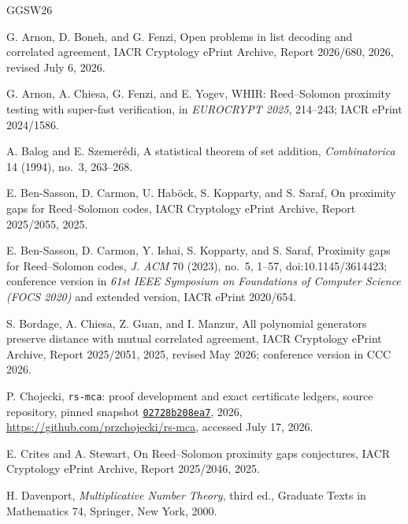 \documentclass[11pt,a4paper]{amsart}
\numberwithin{equation}{section}
\theoremstyle{remark}
\begin{document}
\begin{thebibliography}{GGSW26}

G. Arnon, D. Boneh, and G. Fenzi,
\newblock Open problems in list decoding and correlated agreement,
\newblock IACR Cryptology ePrint Archive, Report 2026/680, 2026,
revised July 6, 2026.

G. Arnon, A. Chiesa, G. Fenzi, and E. Yogev,
\newblock WHIR: Reed--Solomon proximity testing with super-fast verification,
\newblock in \emph{EUROCRYPT 2025}, 214--243;
IACR ePrint 2024/1586.

A. Balog and E. Szemer\'edi,
\newblock A statistical theorem of set addition,
\newblock \emph{Combinatorica} 14 (1994), no.~3, 263--268.

E. Ben-Sasson, D. Carmon, U. Hab\"ock, S. Kopparty, and S. Saraf,
\newblock On proximity gaps for Reed--Solomon codes,
\newblock IACR Cryptology ePrint Archive, Report 2025/2055, 2025.

E. Ben-Sasson, D. Carmon, Y. Ishai, S. Kopparty, and S. Saraf,
\newblock Proximity gaps for Reed--Solomon codes,
\newblock \emph{J. ACM} 70 (2023), no.~5, 1--57,
\newblock doi:10.1145/3614423; conference version in
\emph{61st IEEE Symposium on Foundations of Computer Science
(FOCS 2020)} and extended version, IACR ePrint 2020/654.

S. Bordage, A. Chiesa, Z. Guan, and I. Manzur,
\newblock All polynomial generators preserve distance with mutual
correlated agreement,
\newblock IACR Cryptology ePrint Archive, Report 2025/2051, 2025,
revised May 2026; conference version in CCC 2026.

P. Chojecki,
\newblock \texttt{rs-mca}: proof development and exact certificate ledgers,
\newblock source repository, pinned snapshot
\href{https://github.com/przchojecki/rs-mca/tree/02728b208ea785d02115ea967236aebf653b31ec}{\texttt{02728b208ea7}}, 2026,
\newblock \url{https://github.com/przchojecki/rs-mca}, accessed July 17, 2026.

E. Crites and A. Stewart,
\newblock On Reed--Solomon proximity gaps conjectures,
\newblock IACR Cryptology ePrint Archive, Report 2025/2046, 2025.

H. Davenport,
\newblock \emph{Multiplicative Number Theory}, third ed.,
\newblock Graduate Texts in Mathematics 74, Springer, New York, 2000.


\end{thebibliography}
\end{document}
